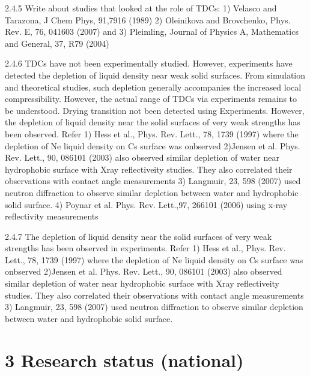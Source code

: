 \par 2.4.5 Write about studies that looked at the role of TDCs: 1) Velasco and Tarazona, J Chem Phys, 91,7916 (1989) 2) Oleinikova and Brovchenko, Phys. Rev. E, 76, 041603 (2007) and 3) Pleimling, Journal of Physics A, Mathematics and General, 37, R79 (2004)
\par 2.4.6 TDCs have not been experimentally studied. However, experiments have detected the depletion of liquid density near weak solid surfaces. From simulation and theoretical studies, such depletion generally accompanies the increased local compressibility.  However, the actual range of TDCs via experiments remains to be understood. Drying transition not been detected using Experiments. However, the depletion of liquid density near the solid surfaces of very weak strengths has been observed. Refer 1) Hess et al., Phys. Rev. Lett., 78, 1739 (1997) where the depletion of Ne liquid density on Cs surface was onbserved 2)Jensen et al. Phys. Rev. Lett., 90, 086101 (2003) also observed similar depletion of water near hydrophobic surface with Xray reflectiveity studies. They also correlated their observations with contact angle measurements 3) Langmuir, 23, 598 (2007) used neutron diffraction to observe similar depletion between water and hydrophobic solid surface. 4) Poynar et al. Phys. Rev. Lett.,97, 266101 (2006) using x-ray reflectivity measurements
\par 2.4.7 The depletion of liquid density near the solid surfaces of very weak strengths has been observed in experiments. Refer 1) Hess et al., Phys. Rev. Lett., 78, 1739 (1997) where the depletion of Ne liquid density on Cs surface was onbserved 2)Jensen et al. Phys. Rev. Lett., 90, 086101 (2003) also observed similar depletion of water near hydrophobic surface with Xray reflectiveity studies. They also correlated their observations with contact angle measurements 3) Langmuir, 23, 598 (2007) used neutron diffraction to observe similar depletion between water and hydrophobic solid surface.\section{3 Research status (national)}

